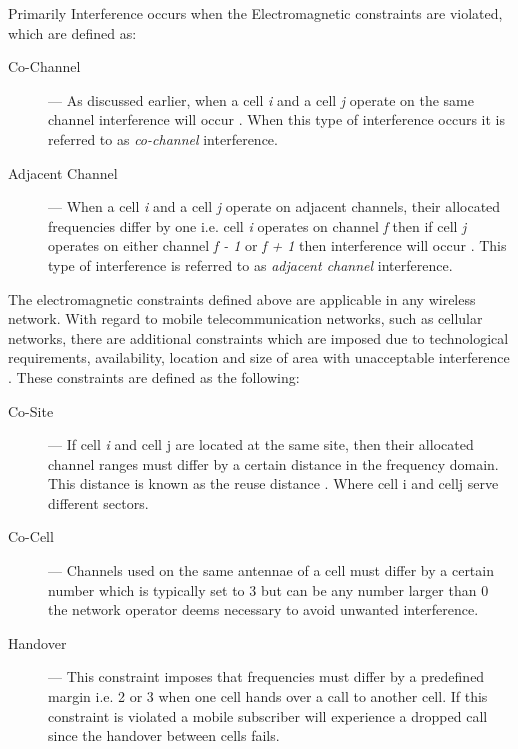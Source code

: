Primarily Interference occurs when the Electromagnetic constraints are violated, which are defined as:
\begin{description}
\item[Co-Channel] --- As discussed earlier, when a cell \emph{i} and a cell \emph{j} operate on the same channel interference will occur \cite{WirelessCommunications,WirelessDigitalCommunications,GSMSysEngin,PrinciplesMobileCommunication,Eisenblatter,EfficientEvoChannelManagement,Karen2004,ACOvsEA,InterferenceOrientatedFAP}. When this type of interference occurs it is referred to as \emph{co-channel} interference.
\item[Adjacent Channel] --- When a cell \emph{i} and a cell \emph{j} operate on adjacent channels, their allocated frequencies differ by one i.e. cell \emph{i} operates on channel \emph{f} then if cell \emph{j} operates on either channel \emph{f - 1} or \emph{f + 1} then interference will occur \cite{WirelessCommunications,WirelessDigitalCommunications,GSMSysEngin,PrinciplesMobileCommunication,Eisenblatter,EfficientEvoChannelManagement,Karen2004,ACOvsEA,InterferenceOrientatedFAP}. This type of interference is referred to as \emph{adjacent channel} interference.
\end{description}

The electromagnetic constraints defined above are applicable in any wireless network. With regard to mobile telecommunication networks, such as cellular networks, there are additional constraints which are imposed due to technological requirements, availability, location and size of area with unacceptable interference \cite{Karen2004,Eisenblatter,AndreasPaper}. These constraints are defined as the following:
\begin{description}
\item[Co-Site] --- If cell \emph{i} and cell {j} are located at the same site, then their allocated channel ranges must differ by a certain distance in the frequency domain. This distance is known as the reuse distance \cite{FixedFAPPSO,EgyptFAPPSO,Karen2004,AdreasPaper}. Where cell {i} and cell{j} serve different sectors.
\item[Co-Cell] --- Channels used on the same antennae of a cell must differ by a certain number which is typically set to 3 but can be any number larger than 0 the network operator deems necessary to avoid unwanted interference\cite{Karen200,Eisenblatter,AndreasPaper}.
\item[Handover] --- This constraint imposes that frequencies must differ by a predefined margin i.e. 2 or 3 when one cell hands over a call to another cell. If this constraint is violated a mobile subscriber will experience a dropped call since the handover between cells fails\cite{Karen200,Eisenblatter,AndreasPaper}.
\end{description}

